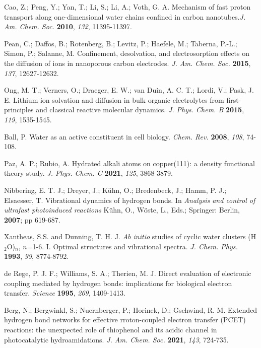 \documentclass[aps,twocolumn,amssymb,amsfonts,amsmath,showpacs,final,a4paper,superscriptaddress]{revtex4-2}
\begin{document}
\begin{thebibliography}{99}
 Cao, Z.; Peng, Y.; Yan, T.; Li, S.; Li, A.; Voth, G. A. Mechanism of fast proton transport along one-dimensional water chains confined in carbon nanotubes.\textit{J. Am. Chem. Soc.} \textbf{2010}, \textit{132}, 11395-11397.

 Pean, C.; Daffos, B.; Rotenberg, B.; Levitz, P.; Haefele, M.; Taberna, P.-L.; Simon, P.; Salanne, M.  Confinement, desolvation, and electrosorption effects on the diffusion of ions in nanoporous carbon electrodes. \textit{J. Am. Chem. Soc.} \textbf{2015}, \textit{137}, 12627-12632.

 Ong, M. T.; Verners, O.; Draeger, E. W.; van Duin, A. C. T.; Lordi, V.; Pask, J. E. Lithium ion solvation and diffusion in bulk organic electrolytes from first-principles and classical reactive molecular dynamics. \textit{J. Phys. Chem. B} \textbf{2015}, \textit{119}, 1535-1545.

 Ball, P. Water as an active constituent in cell biology. \textit{Chem. Rev.} \textbf{2008}, \textit{108}, 74-108.

 Paz, A. P.; Rubio, A. Hydrated alkali atoms on copper(111): a density functional theory study. \textit{J. Phys. Chem. C} \textbf{2021}, \textit{125}, 3868-3879.


 Nibbering, E. T. J.; Dreyer, J.; K\"{u}hn, O.; Bredenbeck, J.; Hamm, P. J.; Elsaesser, T. Vibrational dynamics of hydrogen bonds. In \textit{Analysis and control of ultrafast photoinduced reactions} K\"{u}hn, O., W\"{o}ste, L., Eds.; Springer: Berlin, \textbf{2007}; pp 619-687.


 Xantheas, S.S. and Dunning, T. H. J. \emph{Ab initio} studies of cyclic water clusters (H$_2$O)$_n$, $n$=1-6. I. Optimal structures and vibrational spectra. \textit{J. Chem. Phys.} \textbf{1993}, \textit{99}, 8774-8792.

 de Rege, P. J. F.; Williams, S. A.; Therien, M. J. Direct evaluation of electronic coupling mediated by hydrogen bonds: implications for biological electron transfer. \textit{Science} \textbf{1995}, \textit{269}, 1409-1413.


 Berg, N.; Bergwinkl, S.; Nuernberger, P.; Horinek, D.; Gschwind, R. M. Extended hydrogen bond networks for effective rroton-coupled electron transfer (PCET) reactions: the unexpected role of thiophenol and its acidic channel in photocatalytic hydroamidations. \textit{J. Am. Chem. Soc.} \textbf{2021}, \textit{143}, 724-735.


\end{thebibliography}
\end{document}
